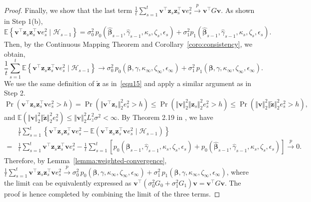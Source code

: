 \documentclass[12pt]{article}
\begin{document}
\begin{proof}
\noindent
Finally, we show that the last term $\frac{1}{t} \sum_{s=1}^t \bm{v}^\top\bm{z}_s \bm{z}_s^{\top} \bm{v} e_s^2 \stackrel{p}{\to} \bm{v}^\top G \bm{v}$.
As shown in Step 1(b),
\[
\mathbb{E} \left\{ \bm{v}^\top\bm{z}_s \bm{z}_s^{\top} \bm{v} e_s^2 \mid \mathcal{H}_{s-1}\right\}=\sigma_0^2 \, p_0(\widehat{\bm{\beta}}_{s-1},\widehat{\gamma}_{s-1},\kappa_s,\zeta_s,\epsilon_s) + \sigma_1^2 p_1(\widehat{\bm{\beta}}_{s-1},\widehat{\gamma}_{s-1},\kappa_s,\zeta_s,\epsilon_s).
\]
Then, by the Continuous Mapping Theorem and Corollary~\ref{coro:consistency}, we obtain,
\[
\frac{1}{t}\sum_{s=1}^t \mathbb{E} \left\{ \bm{v}^\top\bm{z}_s \bm{z}_s^{\top} \bm{v} e_s^2 \mid \mathcal{H}_{s-1}\right\} \to \sigma_0^2 \, p_0(\bm{\beta},\gamma,\kappa_\infty,\zeta_\infty,\epsilon_\infty) + \sigma_1^2 \, p_1(\bm{\beta},\gamma,\kappa_\infty,\zeta_\infty,\epsilon_\infty).
\]
We use the same definition of $\tilde{\bm{z}}$ as  in~\eqref{equ15} and apply a similar argument as in Step 2.
\[
\Pr(\bm{v}^{\top} \bm{z}_s \bm{z}_s^{\top} \bm{v} e_s^2>h)
    =\Pr(\Vert \bm{v}^{\top} \bm{z}_s\Vert_2^2 e_s^2 >h) 
    \le \Pr(\Vert \bm{v}\Vert_2^2 \Vert \bm{z}_s \Vert_2^2 e_s^2>h)
    \le \Pr(\Vert \bm{v}\Vert_2^2 \Vert \tilde{\bm{z}} \Vert_2^2 e_s^2>h),
\]
and $\mathbb{E}(\Vert \bm{v}\Vert_2^2 \Vert \tilde{\bm{z}} \Vert_2^2 e_s^2) \le \Vert \bm{v}\Vert_2^2 L_z^2 \sigma^2< \infty$. By Theorem 2.19 in \cite{hall2014martingale}, we have
\begin{align*}
    &\frac{1}{t}\sum_{s=1}^t \left\{\bm{v}^{\top} \bm{z}_s \bm{z}_s^{\top} \bm{v} e_s^2- \mathbb{E}(\bm{v}^{\top} \bm{z}_s \bm{z}_s^{\top} \bm{v} e_s^2\mid \mathcal{H}_{s-1})\right\} \\
    =& \frac{1}{t} \sum_{s=1}^t \bm{v}^\top\bm{z}_s \bm{z}_s^{\top} \bm{v} e_s^2 - \frac{1}{t}\sum_{s=1}^t\left[p_0(\widehat{\bm{\beta}}_{s-1},\widehat{\gamma}_{s-1},\kappa_s,\zeta_s,\epsilon_s)+ p_0(\widehat{\bm{\beta}}_{s-1},\widehat{\gamma}_{s-1},\kappa_s,\zeta_s,\epsilon_s) \right] \stackrel{p}{\to}0.
\end{align*}
Therefore, by Lemma~\ref{lemma:weighted-convergence}, $\frac{1}{t} \sum_{s=1}^t \bm{v}^\top\bm{z}_s \bm{z}_s^{\top} \bm{v} e_s^2 \stackrel{p}{\to} \sigma_0^2 \, p_0(\bm{\beta},\gamma,\kappa_\infty,\zeta_\infty,\epsilon_\infty) + \sigma_1^2 \, p_1(\bm{\beta},\gamma,\kappa_\infty,\zeta_\infty,\epsilon_\infty)$, where the limit can be equivalently expressed as $\bm{v}^\top (\sigma_0^2 G_0+\sigma_1^2 G_1)\bm{v} = \bm{v}^\top G \bm{v}$.
The proof is hence completed by combining the limit of the three terms.
\end{proof}
\end{document}
